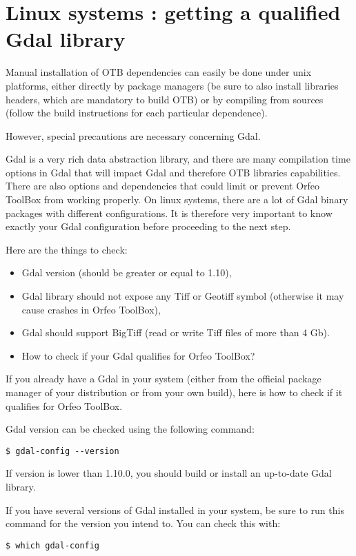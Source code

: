 \section{Linux systems : getting a qualified Gdal library }
\label{sec:gdal}
Manual installation of OTB dependencies can easily be done under unix platforms, either directly by package managers (be sure to also install libraries headers, which are mandatory to build OTB) or by compiling from sources (follow the build instructions for each particular dependence).

However, special precautions are necessary concerning Gdal.
    
Gdal is a very rich data abstraction library, and there are many compilation time options in Gdal that will impact Gdal and therefore OTB libraries capabilities. There are also options and dependencies that could limit or prevent Orfeo ToolBox from working properly. On linux systems, there are a lot of Gdal binary packages with different configurations. It is therefore very important to know exactly your Gdal configuration before proceeding to the next step.

Here are the things to check:
\begin{itemize}
	\item Gdal version (should be greater or equal to 1.10),
	\item Gdal library should not expose any Tiff or Geotiff symbol (otherwise it may cause crashes in Orfeo ToolBox),
	\item Gdal should support BigTiff (read or write Tiff files of more than 4 Gb).
\end{itemize}

\begin{itemize}
	\item {How to check if your Gdal qualifies for Orfeo ToolBox?}
\end{itemize}
If you already have a Gdal in your system (either from the official package manager of your distribution or from your own build), here is how to check if it qualifies for Orfeo ToolBox.

Gdal version can be checked using the following command:
\begin{verbatim}
$ gdal-config --version
\end{verbatim}

If version is lower than 1.10.0, you should build or install an up-to-date Gdal library.

If you have several versions of Gdal installed in your system, be sure to run this command for the version you intend to. You can check this with:
\begin{verbatim}
$ which gdal-config
\end{verbatim}

